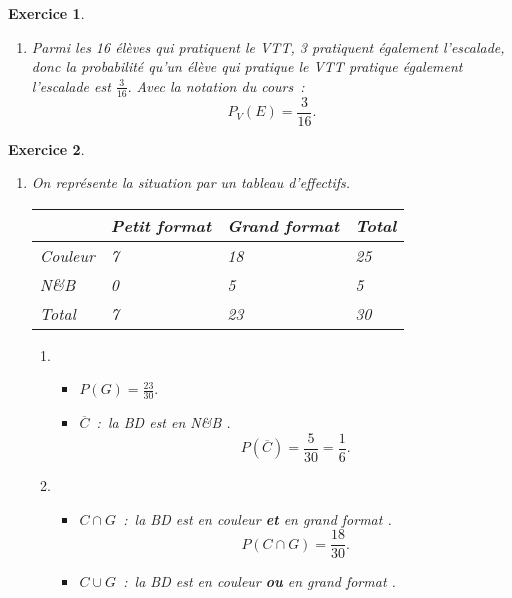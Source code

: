 \documentclass[10pt]{article}
\newtheorem{exo}{Exercice}
\begin{document}
\begin{exo}
\begin{enumerate}
\begin{enumerate}
\begin{itemize}
\end{itemize}

Dans tous les cas on obtient $P(V\cup E)=\frac{23}{32}.$
\item Parmi les 16 élèves qui pratiquent le VTT, 3 pratiquent également l'escalade, donc la probabilité qu'un élève qui pratique le VTT pratique également l'escalade est $\frac{3}{16}.$ Avec la notation du cours~:
\[P_V(E)=\frac{3}{16}.\]
\end{enumerate}
\end{enumerate}

\end{exo}


\begin{exo}

\begin{enumerate}
\item On représente la situation par un tableau d'effectifs.

\begin{center}
 \begin{tabular}{|m{}|m{}|m{}|m{}|}\hline
& Petit format &Grand format& Total \\ \hline 
Couleur&7 & 18&25 \\ \hline
N\&B& 0 & 5& 5\\ \hline
Total& 7& 23& 30\\ \hline
\end{tabular}
\end{center}



\begin{enumerate}
\item \begin{itemize}
\item[\textbullet] $P(G)=\frac{23}{30}.$
\item[\textbullet] $\overline{C}$~:~\og la BD est en N\&B \fg.
\[P\left(\overline{C}\right)=\frac{5}{30}=\frac{1}{6}.\]
\end{itemize}
\item \begin{itemize}
\item[\textbullet] $C\cap G$~:~\og la BD est en couleur \textbf{et} en grand format \fg.
\[P(C\cap G)=\frac{18}{30}.\]
\item[\textbullet] $C\cup G$~:~\og la BD est en couleur \textbf{ou} en grand format \fg.


\end{itemize}
\end{enumerate}
\end{enumerate}
\end{exo}
\end{document}
